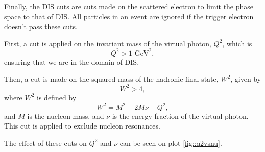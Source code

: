     Finally, the DIS cuts are cuts made on the scattered electron to limit the phase space to that of DIS.
    All particles in an event are ignored if the trigger electron doesn't pass these cuts.

    First, a cut is applied on the invariant mass of the virtual photon, $Q^2$, which is
    \begin{equation*}
        Q^2 > 1 \text{ GeV}^2,
    \end{equation*}
    ensuring that we are in the domain of DIS.

    Then, a cut is made on the squared mass of the hadronic final state, $W^2$, given by
    \begin{equation*}
        W^2 > 4,
    \end{equation*}
    where $W^2$ is defined by
    \begin{equation*}
        W^2 = M^2 + 2M\nu - Q^2,
    \end{equation*}
    and $M$ is the nucleon mass, and $\nu$ is the energy fraction of the virtual photon.
    This cut is applied to exclude nucleon resonances.

    The effect of these cuts on $Q^2$ and $\nu$ can be seen on plot \ref{fig::q2vsnu}.
